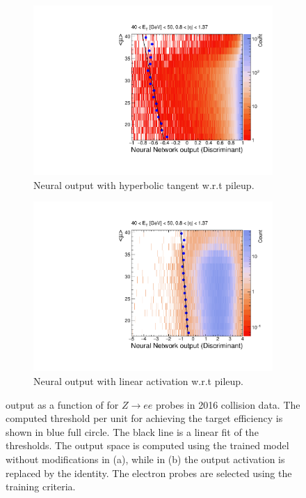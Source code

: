 \begin{figure}[h!tb]
  \begin{center}
  \begin{subfigure}[c]{.48\textwidth}
  \centering
  \includegraphics[width=\textwidth]{sections/03_ringer/figures/th2_signal_tight_cutbased_et3_eta1_with_tansig.pdf}
  \caption{Neural output with hyperbolic tangent w.r.t pileup.}
  \label{fig:nn_correction_with_tansig}
  \end{subfigure}
  \hfill
  \begin{subfigure}[c]{.48\textwidth}
  \centering
  \includegraphics[width=\textwidth]{sections/03_ringer/figures/th2_signal_tight_cutbased_et3_eta1_without_tansig.pdf}
  \caption{Neural output with linear activation w.r.t pileup.}
  \label{fig:nn_correction_without_tansig}
  \end{subfigure}
  \caption{
    \rnn output as a function of \avgmu{} for $Z\rightarrow ee$ probes in 
    2016 collision data.
    The computed threshold per \avgmu{} unit for achieving the target 
    efficiency is shown in blue full circle. The black line is a linear fit of the thresholds.
    The output space is computed using the trained model without modifications 
    in (a), while in (b) the output activation is replaced by the identity.
    The electron probes are selected using the training criteria.
  }%
  \end{center}
  \end{figure}
